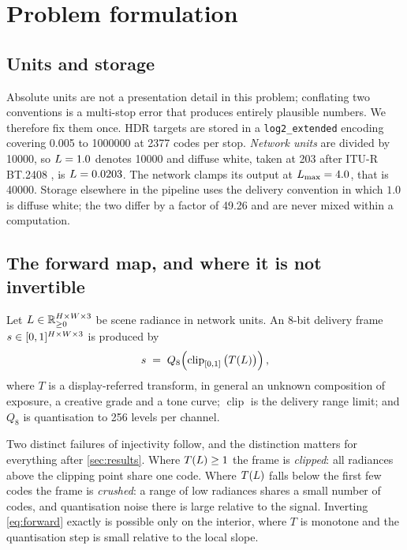 \section{Problem formulation}
\label{sec:formulation}

\subsection{Units and storage}
\label{sec:units}

Absolute units are not a presentation detail in this problem; conflating two
conventions is a multi-stop error that produces entirely plausible numbers. We
therefore fix them once. HDR targets are stored in a \texttt{log2\_extended}
encoding covering \SI{0.005}{\nits} to \SI{1000000}{\nits} at \num{2377} codes
per stop. \emph{Network units} are \si{\nits} divided by \num{10000}, so
$L = 1.0$ denotes \SI{10000}{\nits} and diffuse white, taken at
\SI{203}{\nits} after ITU-R BT.2408 \citep{bt2408}, is $L = \num{0.0203}$.
The network clamps its output at $L_{\max} = 4.0$, that is \SI{40000}{\nits}.
Storage elsewhere in the pipeline uses the delivery convention in which $1.0$ is
diffuse white; the two differ by a factor of \num{49.26} and are never mixed
within a computation.

\subsection{The forward map, and where it is not invertible}
\label{sec:forward}

Let $L \in \mathbb{R}^{H \times W \times 3}_{\ge 0}$ be scene radiance in
network units. An 8-bit delivery frame $s \in [0,1]^{H \times W \times 3}$ is
produced by
\begin{equation}
s \;=\; Q_{8}\!\left(\operatorname{clip}_{[0,1]}\big(T(L)\big)\right),
\label{eq:forward}
\end{equation}
where $T$ is a display-referred transform, in general an unknown composition of
exposure, a creative grade and a tone curve; $\operatorname{clip}$ is the
delivery range limit; and $Q_{8}$ is quantisation to 256 levels per channel.

Two distinct failures of injectivity follow, and the distinction matters for
everything after \cref{sec:results}. Where $T(L) \ge 1$ the frame is
\emph{clipped}: all radiances above the clipping point share one code.
Where $T(L)$ falls below the first few codes the frame is \emph{crushed}: a
range of low radiances shares a small number of codes, and quantisation noise
there is large relative to the signal. Inverting \cref{eq:forward} exactly is
possible only on the interior, where $T$ is monotone and the quantisation step
is small relative to the local slope.


